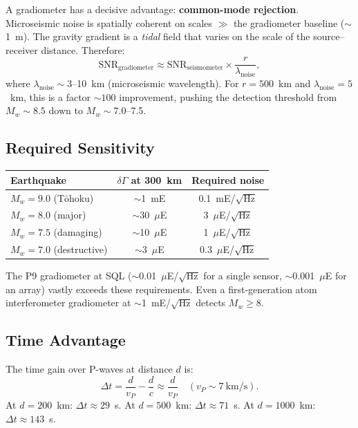 \documentclass[11pt]{article}
\theoremstyle{definition}
\theoremstyle{remark}
\begin{document}
A gradiometer has a decisive advantage: \textbf{common-mode rejection}.
Microseismic noise is spatially coherent on scales $\gg$ the gradiometer
baseline ($\sim$1~m). The gravity gradient is a \emph{tidal} field
that varies on the scale of the source--receiver distance. Therefore:
\begin{equation}
  \text{SNR}_{\text{gradiometer}} \approx
  \text{SNR}_{\text{seismometer}} \times \frac{r}{\lambda_{\text{noise}}},
\end{equation}
where $\lambda_{\text{noise}} \sim 3$--10~km (microseismic wavelength).
For $r = 500$~km and $\lambda_{\text{noise}} = 5$~km, this is a
factor $\sim 100$ improvement, pushing the detection threshold from
$M_w \sim 8.5$ down to $M_w \sim 7.0$--7.5.

\subsection{Required Sensitivity}

\begin{center}
\begin{tabular}{lcc}
\toprule
\textbf{Earthquake} & \textbf{$\delta\Gamma$ at 300~km} & \textbf{Required noise} \\
\midrule
$M_w = 9.0$ (T\={o}hoku) & $\sim$1~mE & 0.1~mE/$\sqrt{\text{Hz}}$ \\
$M_w = 8.0$ (major) & $\sim$30~$\mu$E & 3~$\mu$E/$\sqrt{\text{Hz}}$ \\
$M_w = 7.5$ (damaging) & $\sim$10~$\mu$E & 1~$\mu$E/$\sqrt{\text{Hz}}$ \\
$M_w = 7.0$ (destructive) & $\sim$3~$\mu$E & 0.3~$\mu$E/$\sqrt{\text{Hz}}$ \\
\bottomrule
\end{tabular}
\end{center}

The P9 gradiometer at SQL ($\sim$0.01~$\mu$E/$\sqrt{\text{Hz}}$
for a single sensor, $\sim$0.001~$\mu$E for an array) vastly exceeds
these requirements. Even a first-generation atom interferometer
gradiometer at $\sim$1~mE/$\sqrt{\text{Hz}}$ detects $M_w \geq 8$.

\subsection{Time Advantage}

The time gain over P-waves at distance $d$ is:
\begin{equation}
  \Delta t = \frac{d}{v_P} - \frac{d}{c}
  \approx \frac{d}{v_P}
  \quad (v_P \sim 7~\text{km/s}).
\end{equation}
At $d = 200$~km: $\Delta t \approx 29$~s.
At $d = 500$~km: $\Delta t \approx 71$~s.
At $d = 1000$~km: $\Delta t \approx 143$~s.
\end{document}
